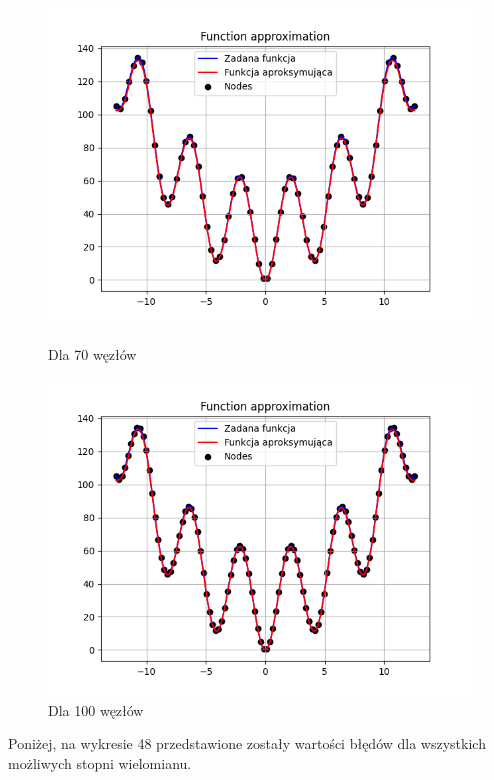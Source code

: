 \documentclass{article}
\begin{document}
\begin{figure}[H]
\begin{minipage}[b]{0.49\textwidth}
    \begin{minipage}[b]{\textwidth}
      \includegraphics[width=\textwidth]{img46.png}
      \caption{Dla 70 węzłów}
    \end{minipage}
    \vspace*{\fill}
    \begin{minipage}[b]{\textwidth}
      \includegraphics[width=\textwidth]{img47.png}
      \caption{Dla 100 węzłów}
    \end{minipage}
  \end{minipage}
\end{figure}

\noindent
Poniżej, na wykresie 48 przedstawione zostały wartości błędów dla wszystkich możliwych stopni wielomianu.
\end{document}
